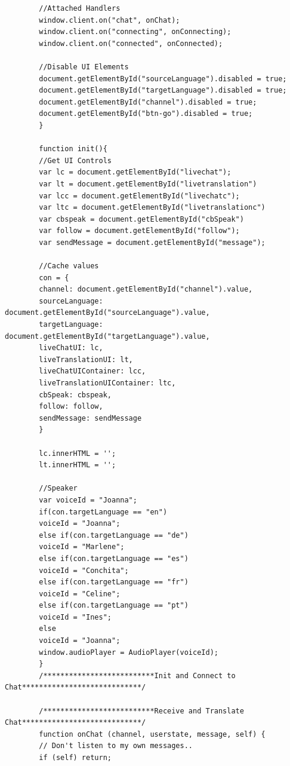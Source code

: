 \documentclass[english,runningheads,a4paper]{llncs}[2018/03/10]
\begin{document}
{\begin{verbatim}
        //Attached Handlers
        window.client.on("chat", onChat);
        window.client.on("connecting", onConnecting);
        window.client.on("connected", onConnected);
        
        //Disable UI Elements
        document.getElementById("sourceLanguage").disabled = true;
        document.getElementById("targetLanguage").disabled = true;
        document.getElementById("channel").disabled = true;
        document.getElementById("btn-go").disabled = true;
        }
        
        function init(){
        //Get UI Controls
        var lc = document.getElementById("livechat");
        var lt = document.getElementById("livetranslation")
        var lcc = document.getElementById("livechatc");
        var ltc = document.getElementById("livetranslationc")
        var cbspeak = document.getElementById("cbSpeak")
        var follow = document.getElementById("follow");
        var sendMessage = document.getElementById("message");
        
        //Cache values
        con = {
        channel: document.getElementById("channel").value,
        sourceLanguage: document.getElementById("sourceLanguage").value,
        targetLanguage: document.getElementById("targetLanguage").value,
        liveChatUI: lc,
        liveTranslationUI: lt,
        liveChatUIContainer: lcc,
        liveTranslationUIContainer: ltc,
        cbSpeak: cbspeak,
        follow: follow,
        sendMessage: sendMessage
        }
        
        lc.innerHTML = '';
        lt.innerHTML = '';
        
        //Speaker
        var voiceId = "Joanna";
        if(con.targetLanguage == "en")
        voiceId = "Joanna";
        else if(con.targetLanguage == "de")
        voiceId = "Marlene";
        else if(con.targetLanguage == "es")
        voiceId = "Conchita";
        else if(con.targetLanguage == "fr")
        voiceId = "Celine";
        else if(con.targetLanguage == "pt")
        voiceId = "Ines";
        else
        voiceId = "Joanna";
        window.audioPlayer = AudioPlayer(voiceId);
        }
        /**************************Init and Connect to Chat****************************/
        
        /**************************Receive and Translate Chat****************************/
        function onChat (channel, userstate, message, self) {
        // Don't listen to my own messages..
        if (self) return;
        

\end{verbatim}}
\end{document}

